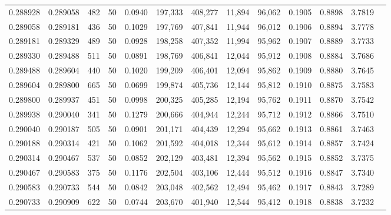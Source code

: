 \begin{tabular}{rrrrrrrrrrrrr}
0.288928 & 0.289058 &   482 &  50 &                                     0.0940 & 197,333 & 408,277 &  11,894 &  96,062 & 0.1905 & 0.8898 & 3.7819 \\
0.289058 & 0.289181 &   436 &  50 &                                     0.1029 & 197,769 & 407,841 &  11,944 &  96,012 & 0.1906 & 0.8894 & 3.7778 \\
0.289181 & 0.289329 &   489 &  50 &                                     0.0928 & 198,258 & 407,352 &  11,994 &  95,962 & 0.1907 & 0.8889 & 3.7733 \\
0.289330 & 0.289488 &   511 &  50 &                                     0.0891 & 198,769 & 406,841 &  12,044 &  95,912 & 0.1908 & 0.8884 & 3.7686 \\
0.289488 & 0.289604 &   440 &  50 &                                     0.1020 & 199,209 & 406,401 &  12,094 &  95,862 & 0.1909 & 0.8880 & 3.7645 \\
0.289604 & 0.289800 &   665 &  50 &                                     0.0699 & 199,874 & 405,736 &  12,144 &  95,812 & 0.1910 & 0.8875 & 3.7583 \\
0.289800 & 0.289937 &   451 &  50 &                                     0.0998 & 200,325 & 405,285 &  12,194 &  95,762 & 0.1911 & 0.8870 & 3.7542 \\
0.289938 & 0.290040 &   341 &  50 &                                     0.1279 & 200,666 & 404,944 &  12,244 &  95,712 & 0.1912 & 0.8866 & 3.7510 \\
0.290040 & 0.290187 &   505 &  50 &                                     0.0901 & 201,171 & 404,439 &  12,294 &  95,662 & 0.1913 & 0.8861 & 3.7463 \\
0.290188 & 0.290314 &   421 &  50 &                                     0.1062 & 201,592 & 404,018 &  12,344 &  95,612 & 0.1914 & 0.8857 & 3.7424 \\
0.290314 & 0.290467 &   537 &  50 &                                     0.0852 & 202,129 & 403,481 &  12,394 &  95,562 & 0.1915 & 0.8852 & 3.7375 \\
0.290467 & 0.290583 &   375 &  50 &                                     0.1176 & 202,504 & 403,106 &  12,444 &  95,512 & 0.1916 & 0.8847 & 3.7340 \\
0.290583 & 0.290733 &   544 &  50 &                                     0.0842 & 203,048 & 402,562 &  12,494 &  95,462 & 0.1917 & 0.8843 & 3.7289 \\
0.290733 & 0.290909 &   622 &  50 &                                     0.0744 & 203,670 & 401,940 &  12,544 &  95,412 & 0.1918 & 0.8838 & 3.7232 \\

\end{tabular}
